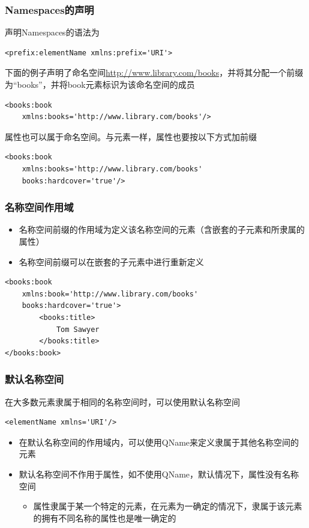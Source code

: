 \subsubsection{Namespaces的声明}
声明Namespaces的语法为
\begin{lstlisting}
<prefix:elementName xmlns:prefix='URI'>
\end{lstlisting}

下面的例子声明了命名空间\;\url{http://www.library.com/books}，并将其分配一个前缀为“books”，并将book元素标识为该命名空间的成员
\begin{lstlisting}
<books:book
	xmlns:books='http://www.library.com/books'/>
\end{lstlisting}
属性也可以属于命名空间。与元素一样，属性也要按以下方式加前缀
\begin{lstlisting}
<books:book
	xmlns:books='http://www.library.com/books'
	books:hardcover='true'/>
\end{lstlisting}

\subsubsection{名称空间作用域}
\begin{itemize}
	\item 名称空间前缀的作用域为定义该名称空间的元素（含嵌套的子元素和所隶属的属性）
	\item 名称空间前缀可以在嵌套的子元素中进行重新定义
\end{itemize}

\begin{lstlisting}
<books:book
	xmlns:book='http://www.library.com/books'
	books:hardcover='true'>
		<books:title>
			Tom Sawyer
		</books:title>
</books:book>
\end{lstlisting}

\subsubsection{默认名称空间}
在大多数元素隶属于相同的名称空间时，可以使用默认名称空间
\begin{lstlisting}
<elementName xmlns='URI'/>
\end{lstlisting}
\begin{itemize}
	\item 在默认名称空间的作用域内，可以使用QName来定义隶属于其他名称空间的元素
	\item 默认名称空间不作用于属性，如不使用QName，默认情况下，属性没有名称空间
	\begin{itemize}
		\item 属性隶属于某一个特定的元素，在元素为一确定的情况下，隶属于该元素的拥有不同名称的属性也是唯一确定的
	\end{itemize}
\end{itemize}

